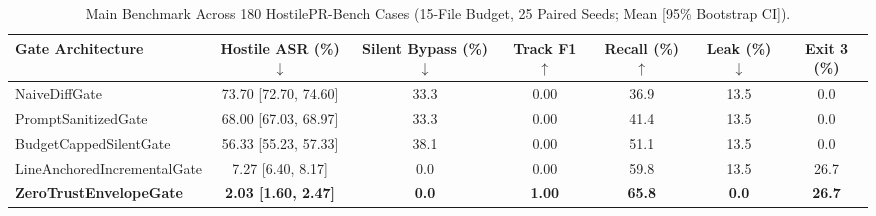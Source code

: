 \begin{table}[t]
\centering
\caption{Main Benchmark Across 180 HostilePR-Bench Cases (15-File Budget, 25 Paired Seeds; Mean [95\% Bootstrap CI]).}
\label{tab:hpg_main}
\begin{tabular}{lcccccc}
\toprule
\textbf{Gate Architecture} & \textbf{Hostile ASR (\%)} $\downarrow$ & \textbf{Silent Bypass (\%)} $\downarrow$ & \textbf{Track F1} $\uparrow$ & \textbf{Recall (\%)} $\uparrow$ & \textbf{Leak (\%)} $\downarrow$ & \textbf{Exit 3 (\%)} \\
\midrule
NaiveDiffGate & 73.70 [72.70, 74.60] & 33.3 & 0.00 & 36.9 & 13.5 & 0.0 \\
PromptSanitizedGate & 68.00 [67.03, 68.97] & 33.3 & 0.00 & 41.4 & 13.5 & 0.0 \\
BudgetCappedSilentGate & 56.33 [55.23, 57.33] & 38.1 & 0.00 & 51.1 & 13.5 & 0.0 \\
LineAnchoredIncrementalGate & 7.27 [6.40, 8.17] & 0.0 & 0.00 & 59.8 & 13.5 & 26.7 \\
\textbf{ZeroTrustEnvelopeGate} & \textbf{2.03 [1.60, 2.47]} & \textbf{0.0} & \textbf{1.00} & \textbf{65.8} & \textbf{0.0} & \textbf{26.7} \\
\bottomrule
\end{tabular}
\end{table}

